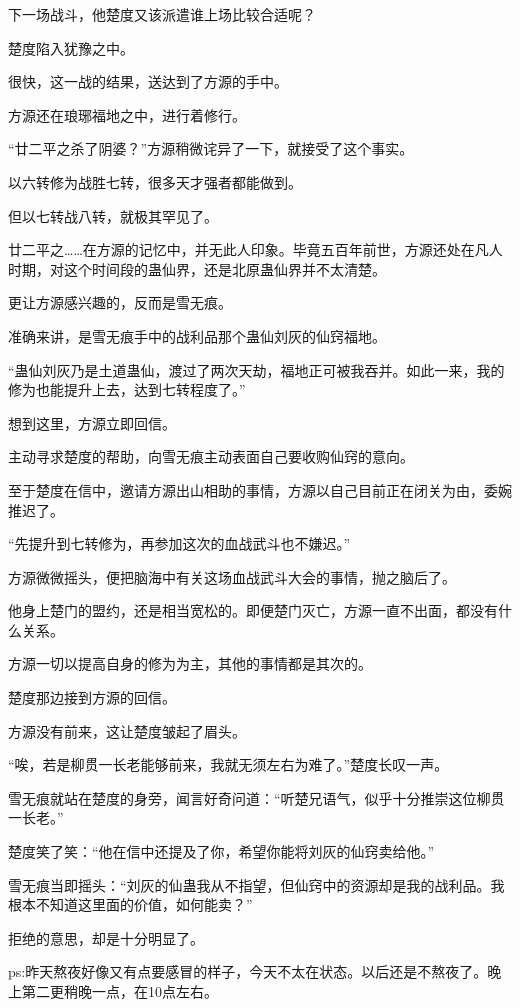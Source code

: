 \begin{this_body}
下一场战斗，他楚度又该派遣谁上场比较合适呢？

楚度陷入犹豫之中。

很快，这一战的结果，送达到了方源的手中。

方源还在琅琊福地之中，进行着修行。

“廿二平之杀了阴婆？”方源稍微诧异了一下，就接受了这个事实。

以六转修为战胜七转，很多天才强者都能做到。

但以七转战八转，就极其罕见了。

廿二平之……在方源的记忆中，并无此人印象。毕竟五百年前世，方源还处在凡人时期，对这个时间段的蛊仙界，还是北原蛊仙界并不太清楚。

更让方源感兴趣的，反而是雪无痕。

准确来讲，是雪无痕手中的战利品那个蛊仙刘灰的仙窍福地。

“蛊仙刘灰乃是土道蛊仙，渡过了两次天劫，福地正可被我吞并。如此一来，我的修为也能提升上去，达到七转程度了。”

想到这里，方源立即回信。

主动寻求楚度的帮助，向雪无痕主动表面自己要收购仙窍的意向。

至于楚度在信中，邀请方源出山相助的事情，方源以自己目前正在闭关为由，委婉推迟了。

“先提升到七转修为，再参加这次的血战武斗也不嫌迟。”

方源微微摇头，便把脑海中有关这场血战武斗大会的事情，抛之脑后了。

他身上楚门的盟约，还是相当宽松的。即便楚门灭亡，方源一直不出面，都没有什么关系。

方源一切以提高自身的修为为主，其他的事情都是其次的。

楚度那边接到方源的回信。

方源没有前来，这让楚度皱起了眉头。

“唉，若是柳贯一长老能够前来，我就无须左右为难了。”楚度长叹一声。

雪无痕就站在楚度的身旁，闻言好奇问道：“听楚兄语气，似乎十分推崇这位柳贯一长老。”

楚度笑了笑：“他在信中还提及了你，希望你能将刘灰的仙窍卖给他。”

雪无痕当即摇头：“刘灰的仙蛊我从不指望，但仙窍中的资源却是我的战利品。我根本不知道这里面的价值，如何能卖？”

拒绝的意思，却是十分明显了。

ps:昨天熬夜好像又有点要感冒的样子，今天不太在状态。以后还是不熬夜了。晚上第二更稍晚一点，在10点左右。

\end{this_body}

